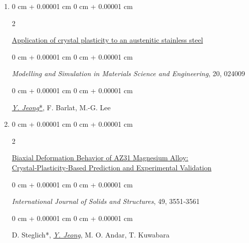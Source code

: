 \documentclass[10pt, letterpaper]{article}
\newenvironment{onecolentry}{
    \begin{adjustwidth}{
        0 cm + 0.00001 cm
    }{
        0 cm + 0.00001 cm
    }
}{
    \end{adjustwidth}
} %
\newenvironment{twocolentry}[2][]{
    \onecolentry
    \def\secondColumn{#2}
    \setcolumnwidth{\fill, 4.5 cm}
    \begin{paracol}{2}
}{
    \switchcolumn \raggedleft \secondColumn
    \end{paracol}
    \endonecolentry
} %
\begin{document}
\begin{enumerate}
        \item
        \begin{twocolentry}{2012}
            \href{http://dx.doi.org/10.1088/0965-0393/20/2/024009}{Application of crystal plasticity to an austenitic stainless steel }
        \end{twocolentry}
        \begin{onecolentry}
            {\it Modelling and Simulation in Materials Science and Engineering}, 20, 024009
        \end{onecolentry}
        \begin{onecolentry}
            {\underline{\textit{Y. Jeong}*}}, F. Barlat, M.-G. Lee
        \end{onecolentry}
        \vspace{0.10 cm}


        \item
        \begin{twocolentry}{2012}
            \href{http://dx.doi.org/10.1016/j.ijsolstr.2012.06.017}{Biaxial Deformation Behavior of AZ31 Magnesium Alloy: Crystal‑Plasticity‑Based Prediction and Experimental Validation}
        \end{twocolentry}
        \begin{onecolentry}
            {\it International Journal of Solids and Structures}, 49, 3551‑3561
        \end{onecolentry}
        \begin{onecolentry}
            D. Steglich*, {\underline{\textit{Y. Jeong}}}, M. O. Andar, T. Kuwabara
        \end{onecolentry}
        \vspace{0.10 cm}

    \end{enumerate}
\end{document}

